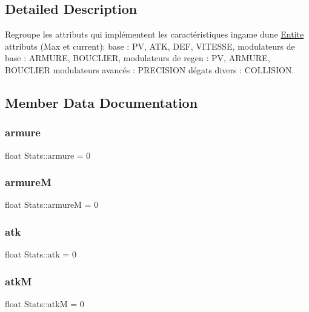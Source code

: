 \subsection{Detailed Description}
Regroupe les attributs qui implémentent les caractéristiques ingame d\textquotesingle{}une \mbox{\hyperlink{class_entite}{Entite}} attributs (Max et current)\+: base \+: PV, A\+TK, D\+EF, V\+I\+T\+E\+S\+SE, modulateurs de base \+: A\+R\+M\+U\+RE, B\+O\+U\+C\+L\+I\+ER, modulateurs de regen \+: PV, A\+R\+M\+U\+RE, B\+O\+U\+C\+L\+I\+ER modulateurs avancés \+: P\+R\+E\+C\+I\+S\+I\+ON dégats divers \+: C\+O\+L\+L\+I\+S\+I\+ON. 

\subsection{Member Data Documentation}
\mbox{\label{struct_stats_afe0c5d28b8ae70881d50a19342e2a0b2}} 
\subsubsection{\texorpdfstring{armure}{armure}}
{\footnotesize\ttfamily float Stats\+::armure = 0}

\mbox{\label{struct_stats_a461c311822f5823e357873e860d5bc7f}} 
\subsubsection{\texorpdfstring{armureM}{armureM}}
{\footnotesize\ttfamily float Stats\+::armureM = 0}

\mbox{\label{struct_stats_ab39791e705dcf08beea5484c6d961328}} 
\subsubsection{\texorpdfstring{atk}{atk}}
{\footnotesize\ttfamily float Stats\+::atk = 0}

\mbox{\label{struct_stats_a9bb13fa529483415c37de4dc5d9e9e60}} 
\subsubsection{\texorpdfstring{atkM}{atkM}}
{\footnotesize\ttfamily float Stats\+::atkM = 0}

